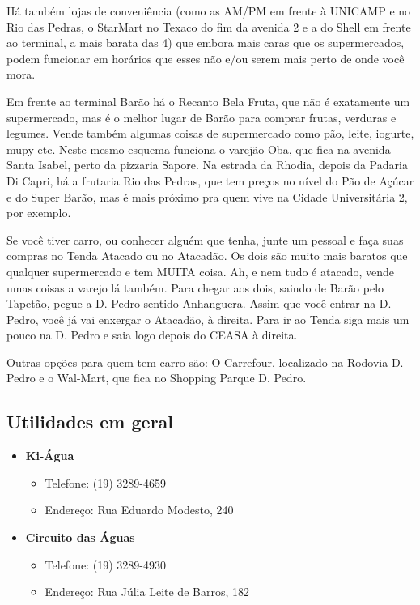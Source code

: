 Há também lojas de conveniência (como as AM/PM em frente à UNICAMP e no Rio das
Pedras, o StarMart no Texaco do fim da avenida 2 e a do Shell em frente ao
terminal, a mais barata das 4) que embora mais caras que os supermercados, podem
funcionar em horários que esses não e/ou serem mais perto de onde você mora.

Em frente ao terminal Barão há o Recanto Bela Fruta, que não é exatamente um
supermercado, mas é o melhor lugar de Barão para comprar frutas, verduras
e legumes. Vende também algumas coisas de supermercado como pão, leite, iogurte,
mupy etc. Neste mesmo esquema funciona o varejão Oba, que fica na avenida Santa
Isabel, perto da pizzaria Sapore. Na estrada da Rhodia, depois da Padaria Di
Capri, há a frutaria Rio das Pedras, que tem preços no nível do Pão de Açúcar
e do Super Barão, mas é mais próximo pra quem vive na Cidade Universitária 2,
por exemplo.

Se você tiver carro, ou conhecer alguém que tenha, junte um pessoal e faça suas
compras no Tenda Atacado ou no Atacadão. Os dois são muito mais baratos que
qualquer supermercado e tem MUITA coisa. Ah, e nem tudo é atacado, vende umas
coisas a varejo lá também. Para chegar aos dois, saindo de Barão pelo Tapetão,
pegue a D. Pedro sentido Anhanguera. Assim que você entrar na D. Pedro, você já
vai enxergar o Atacadão, à direita. Para ir ao Tenda siga mais um pouco na D.
Pedro e saia logo depois do CEASA à direita.

Outras opções para quem tem carro são: O Carrefour, localizado na Rodovia D.
Pedro e o Wal-Mart, que fica no Shopping Parque D. Pedro.

\subsection{Utilidades em geral}
\begin{itemize}
\item  \textbf{Ki-Água}
\begin{itemize}
\item  Telefone: (19) 3289-4659
\item  Endereço: Rua Eduardo Modesto, 240
\end{itemize}
\end{itemize}

\begin{itemize}
\item  \textbf{Circuito das Águas}
\begin{itemize}
\item  Telefone: (19) 3289-4930
\item  Endereço: Rua Júlia Leite de Barros, 182
\end{itemize}
\end{itemize}

